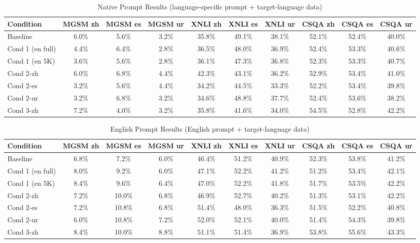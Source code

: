 \documentclass[conference]{IEEEtran}
\begin{document}
\begin{table}[t]
\centering
\caption{Native Prompt Results (language-specific prompt + target-language data)}
\label{tab:native_results}
\begin{tabular}{|l|c|c|c|c|c|c|c|c|c|}
\hline
\textbf{Condition} & \textbf{MGSM zh} & \textbf{MGSM es} & \textbf{MGSM ur} & \textbf{XNLI zh} & \textbf{XNLI es} & \textbf{XNLI ur} & \textbf{CSQA zh} & \textbf{CSQA es} & \textbf{CSQA ur} \\
\hline
Baseline & 6.0\% & 5.6\% & 3.2\% & 35.8\% & 49.1\% & 38.1\% & 52.1\% & 52.4\% & 40.0\% \\
Cond 1 (en full) & 4.4\% & 6.4\% & 2.8\% & 36.5\% & 48.0\% & 36.9\% & 52.4\% & 53.3\% & 40.6\% \\
Cond 1 (en 5K) & 3.6\% & 5.6\% & 2.8\% & 36.1\% & 47.3\% & 36.8\% & 52.3\% & 53.3\% & 40.7\% \\
Cond 2-zh & 6.0\% & 6.8\% & 4.4\% & 42.3\% & 43.1\% & 36.2\% & 52.9\% & 53.4\% & 41.0\% \\
Cond 2-es & 3.2\% & 5.6\% & 4.4\% & 34.2\% & 44.5\% & 33.3\% & 52.2\% & 53.4\% & 39.8\% \\
Cond 2-ur & 3.2\% & 6.8\% & 3.2\% & 34.6\% & 48.8\% & 37.7\% & 52.4\% & 53.6\% & 38.2\% \\
Cond 3-zh & 7.2\% & 4.0\% & 3.2\% & 35.8\% & 41.6\% & 34.0\% & 54.5\% & 52.8\% & 42.2\% \\
\hline
\end{tabular}
\end{table}

\begin{table}[t]
\centering
\caption{English Prompt Results (English prompt + target-language data)}
\label{tab:english_results}
\begin{tabular}{|l|c|c|c|c|c|c|c|c|c|}
\hline
\textbf{Condition} & \textbf{MGSM zh} & \textbf{MGSM es} & \textbf{MGSM ur} & \textbf{XNLI zh} & \textbf{XNLI es} & \textbf{XNLI ur} & \textbf{CSQA zh} & \textbf{CSQA es} & \textbf{CSQA ur} \\
\hline
Baseline & 6.8\% & 7.2\% & 6.0\% & 46.4\% & 51.2\% & 40.9\% & 52.3\% & 53.8\% & 41.2\% \\
Cond 1 (en full) & 8.0\% & 9.2\% & 6.0\% & 47.1\% & 52.2\% & 41.2\% & 51.2\% & 53.4\% & 42.1\% \\
Cond 1 (en 5K) & 8.4\% & 9.6\% & 6.4\% & 47.0\% & 52.2\% & 41.8\% & 51.7\% & 53.5\% & 42.2\% \\
Cond 2-zh & 7.2\% & 10.0\% & 6.8\% & 46.9\% & 52.7\% & 40.2\% & 51.3\% & 53.1\% & 42.2\% \\
Cond 2-es & 7.2\% & 10.8\% & 6.8\% & 51.4\% & 48.0\% & 36.3\% & 51.5\% & 52.2\% & 40.8\% \\
Cond 2-ur & 6.0\% & 10.8\% & 7.2\% & 52.0\% & 52.1\% & 40.0\% & 51.4\% & 54.3\% & 39.8\% \\
Cond 3-zh & 8.4\% & 10.0\% & 8.8\% & 51.1\% & 51.4\% & 36.9\% & 53.8\% & 55.6\% & 43.3\% \\
\hline
\end{tabular}
\end{table}
\end{document}

